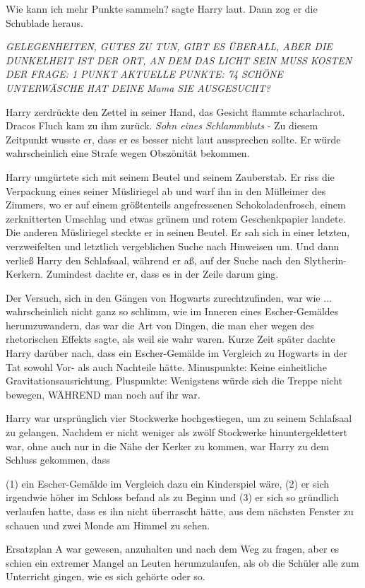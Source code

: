 \glqq{}Wie kann ich mehr Punkte sammeln?\grqq{} sagte Harry laut. Dann zog er die
Schublade heraus.

\emph{GELEGENHEITEN, GUTES ZU TUN, GIBT ES ÜBERALL, ABER DIE DUNKELHEIT IST DER
ORT, AN DEM DAS LICHT SEIN MUSS} \emph{KOSTEN DER FRAGE: 1 PUNKT}
\emph{AKTUELLE PUNKTE: 74} \emph{SCHÖNE UNTERWÄSCHE HAT DEINE Mama SIE
AUSGESUCHT?}

Harry zerdrückte den Zettel in seiner Hand, das Gesicht flammte scharlachrot.
Dracos Fluch kam zu ihm zurück. \emph{Sohn eines Schlammbluts} - Zu diesem
Zeitpunkt wusste er, dass er es besser nicht laut aussprechen sollte. Er würde
wahrscheinlich eine Strafe wegen Obszönität bekommen.

Harry umgürtete sich mit seinem Beutel und seinem Zauberstab. Er riss die
Verpackung eines seiner Müsliriegel ab und warf ihn in den Mülleimer des
Zimmers, wo er auf einem größtenteils angefressenen Schokoladenfrosch, einem
zerknitterten Umschlag und etwas grünem und rotem Geschenkpapier landete. Die
anderen Müsliriegel steckte er in seinen Beutel. Er sah sich in einer letzten,
verzweifelten und letztlich vergeblichen Suche nach Hinweisen um. Und dann
verließ Harry den Schlafsaal, während er aß, auf der Suche nach den
Slytherin-Kerkern. Zumindest dachte er, dass es in der Zeile darum ging.

Der Versuch, sich in den Gängen von Hogwarts zurechtzufinden, war wie ...
wahrscheinlich nicht ganz so schlimm, wie im Inneren eines Escher-Gemäldes
herumzuwandern, das war die Art von Dingen, die man eher wegen des rhetorischen
Effekts sagte, als weil sie wahr waren. Kurze Zeit später dachte Harry darüber
nach, dass ein Escher-Gemälde im Vergleich zu Hogwarts in der Tat sowohl Vor-
als auch Nachteile hätte. Minuspunkte: Keine einheitliche
Gravitationsausrichtung. Pluspunkte: Wenigstens würde sich die Treppe nicht
bewegen, WÄHREND man noch auf ihr war.

Harry war ursprünglich vier Stockwerke hochgestiegen, um zu seinem Schlafsaal zu
gelangen. Nachdem er nicht weniger als zwölf Stockwerke hinuntergeklettert war,
ohne auch nur in die Nähe der Kerker zu kommen, war Harry zu dem Schluss
gekommen, dass

(1) ein Escher-Gemälde im Vergleich dazu ein Kinderspiel wäre, (2) er sich
irgendwie höher im Schloss befand als zu Beginn und (3) er sich so gründlich
verlaufen hatte, dass es ihn nicht überrascht hätte, aus dem nächsten Fenster zu
schauen und zwei Monde am Himmel zu sehen.

Ersatzplan A war gewesen, anzuhalten und nach dem Weg zu fragen, aber es schien
ein extremer Mangel an Leuten herumzulaufen, als ob die Schüler alle zum
Unterricht gingen, wie es sich gehörte oder so.

